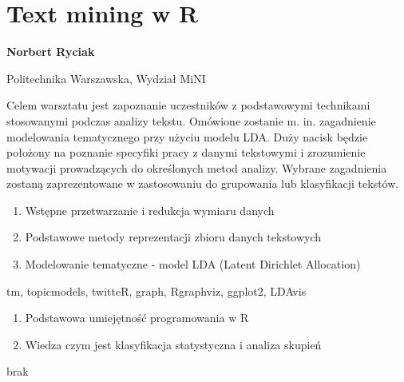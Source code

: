 \documentclass[\main/boa.tex]{subfiles}
\begin{document}
\section{Text mining w R}

\begin{minipage}{0.915\textwidth}
\centering
{\bf {} Norbert Ryciak}
\end{minipage}

\vskip 0.3cm

\begin{affiliations}
\begin{minipage}{0.915\textwidth}
\centering
\large Politechnika Warszawska, Wydział MiNI  \\[2pt]
\end{minipage}
\end{affiliations}

\vskip 0.8cm

\opiswarsztatu Celem warsztatu jest zapoznanie uczestników z podstawowymi technikami stosowanymi podczas analizy tekstu. Omówione zostanie m. in. zagadnienie modelowania tematycznego przy użyciu modelu LDA. Duży nacisk będzie położony na poznanie specyfiki pracy z danymi tekstowymi i zrozumienie motywacji prowadzących do określonych metod analizy. Wybrane zagadnienia zostaną zaprezentowane w zastosowaniu do grupowania lub klasyfikacji tekstów.

\planwarsztatu
\begin{enumerate}
\item Wstępne przetwarzanie i redukcja wymiaru danych
\item Podstawowe metody reprezentacji zbioru danych tekstowych
\item Modelowanie tematyczne - model LDA (Latent Dirichlet Allocation)
\end{enumerate}	 

\pakiety tm, topicmodels, twitteR, graph, Rgraphviz, ggplot2, LDAvis

\umiejetnosci\begin{enumerate}
	\item Podstawowa umiejętność programowania w R
	\item Wiedza czym jest klasyfikacja statystyczna i analiza skupień
\end{enumerate}

\wymagania brak
\end{document}
